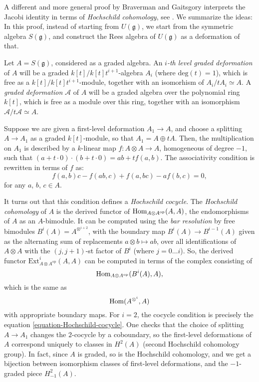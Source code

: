 \begin{remark}
 \label{remark-PBW-Hochschild}
A different and more general proof by Braverman and Gaitsgory interprets the Jacobi identity in terms of \emph{Hochschild cohomology}, see \cite{Braverman-Gaitsgory-PBW}. We summarize the ideas: In this proof, instead of starting from $U(\mathfrak g)$, we start from the symmetric algebra $S(\mathfrak g)$, and construct the Rees algebra of $U(\mathfrak g)$ as a deformation of that. 

Let $A=S(\mathfrak g)$, considered as a graded algebra. An \emph{$i$-th level graded deformation} of $A$ will be a graded $k[t]/k[t]t^{i+1}$-algebra $A_i$ (where $\text{deg}(t)=1$), which is free as a $k[t]/k[t]t^{i+1}$-module, together with an isomorhism of $A_i/tA_i \simeq A$. A \emph{graded deformation} $\mathcal A$ of $A$ will be a graded algebra over the
polynomial ring $k[t]$, which is free as a module over this ring,
together with an isomorphism $\mathcal A/t\mathcal A\simeq A$.

Suppose we are given a first-level deformation $A_1 \to A $, and choose a splitting $A\to A_1$ as a graded $k[t]$-module, so that $A_1 = A \oplus t A$. Then, the multiplication on $A_1$ is described by a $k$-linear map $f: A\otimes A \to A$, homogeneous of degree $-1$, such that $(a+t \cdot 0)\cdot (b+t\cdot 0) = ab + t f(a,b)$. The associativity condition is rewritten in terms of $f$ as:
\begin{equation}
 \label{equation-Hochschild-cocycle}
f (a, b)c − f (ab, c) + f (a, bc) − af (b, c) = 0, 
\end{equation}
for any $a$, $b$, $c \in A$.

It turns out that this condition defines a \emph{Hochschild cocycle}. The \emph{Hochschild cohomology} of $A$ is the derived functor of $\mathop{\rm Hom}\nolimits_{A\otimes A^{\text{op}}} (A,A)$, the endomorphisms of $A$ as an $A$-bimodule. It can be computed using the \emph{bar resolution} by free bimodules $B^i (A) = A^{\otimes^{i+2}}$, with the boundary map $B^i (A) \to B^{i-1}(A)$ given as the alternating sum of replacements $a\otimes b \mapsto ab$, over all identifications of $A\otimes A$ with the $(j, j+1)$-st factor of $B^i$ (where $j=0\dots i$). So, the derived functor $\text{Ext}^i_{A\otimes A^{\text{op}}} (A,A)$ can be computed in terms of the complex consisting of 
$$ \mathop{\rm Hom}\nolimits_{A\otimes A^{\text{op}}} (B^i(A),A),$$
which is the same as 
$$\mathop{\rm Hom}\nolimits (A^{\otimes^i},A)$$
with appropriate boundary maps. For $i=2$, the cocycle condition is precisely the equation \eqref{equation-Hochschild-cocycle}. One checks that the choice of splitting $A\to A_1$ changes the $2$-cocycle by a coboundary, so the first-level deformations of $A$ correspond uniquely to classes in $H^2(A)$ (second Hochschild cohomology group). In fact, since $A$ is graded, so is the Hochschild cohomology, and we get a bijection between isomorphism classes of first-level deformations, and the $-1$-graded piece $H^2_{-1}(A)$. 


\end{remark}
